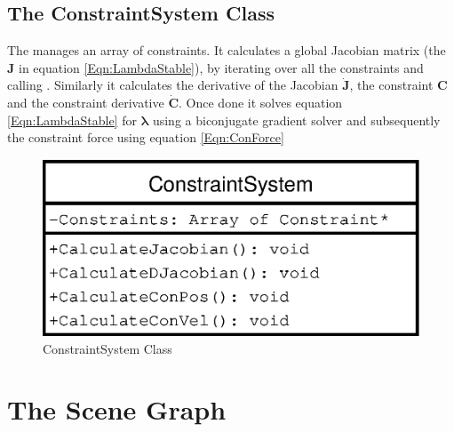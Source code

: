 \subsection{The ConstraintSystem Class}
\label{SubSec:ConstraintSystem}
The  manages an array of constraints. It calculates
a global Jacobian matrix (the $\mathbf{J}$ in equation \ref{Eqn:LambdaStable}), by
iterating over all the constraints and calling
. Similarly it calculates the
derivative of the Jacobian $\dot{\mathbf{J}}$, the constraint $\mathbf{C}$ and
the constraint derivative $\dot{\mathbf{C}}$. Once done it solves equation \ref{Eqn:LambdaStable}
for $\mathbf{\lambda}$ using a biconjugate gradient solver \cite{NumRecipes}
and subsequently the constraint force using equation \ref{Eqn:ConForce}

\begin{figure}
    \centering
    \includegraphics[height=0.2\textheight]{ConstraintSystemDia}    
    \caption{\label{Fig:ConstraintSystemDia}ConstraintSystem Class}
\end{figure}

\section{The Scene Graph}
\label{Sec:SceneGraph}
